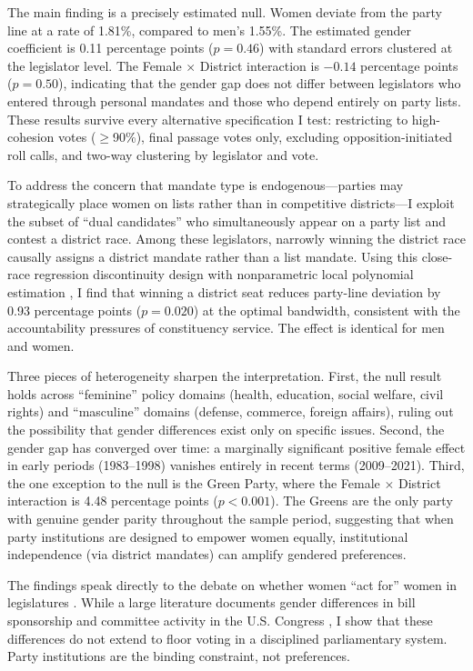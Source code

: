 \documentclass[12pt]{article}
\begin{document}
The main finding is a precisely estimated null. Women deviate from the party line at a rate of 1.81\%, compared to men's 1.55\%. The estimated gender coefficient is 0.11 percentage points ($p = 0.46$) with standard errors clustered at the legislator level. The Female $\times$ District interaction is $-0.14$ percentage points ($p = 0.50$), indicating that the gender gap does not differ between legislators who entered through personal mandates and those who depend entirely on party lists. These results survive every alternative specification I test: restricting to high-cohesion votes ($\geq$90\%), final passage votes only, excluding opposition-initiated roll calls, and two-way clustering by legislator and vote.

To address the concern that mandate type is endogenous---parties may strategically place women on lists rather than in competitive districts---I exploit the subset of ``dual candidates'' who simultaneously appear on a party list and contest a district race. Among these legislators, narrowly winning the district race causally assigns a district mandate rather than a list mandate. Using this close-race regression discontinuity design with nonparametric local polynomial estimation \citep{calonico2014}, I find that winning a district seat reduces party-line deviation by 0.93 percentage points ($p = 0.020$) at the optimal bandwidth, consistent with the accountability pressures of constituency service. The effect is identical for men and women.

Three pieces of heterogeneity sharpen the interpretation. First, the null result holds across ``feminine'' policy domains (health, education, social welfare, civil rights) and ``masculine'' domains (defense, commerce, foreign affairs), ruling out the possibility that gender differences exist only on specific issues. Second, the gender gap has converged over time: a marginally significant positive female effect in early periods (1983--1998) vanishes entirely in recent terms (2009--2021). Third, the one exception to the null is the Green Party, where the Female $\times$ District interaction is 4.48 percentage points ($p < 0.001$). The Greens are the only party with genuine gender parity throughout the sample period, suggesting that when party institutions are designed to empower women equally, institutional independence (via district mandates) can amplify gendered preferences.

The findings speak directly to the debate on whether women ``act for'' women in legislatures \citep{swers2002, tremblay1998, frederick2009}. While a large literature documents gender differences in bill sponsorship and committee activity in the U.S. Congress \citep{anzia2011, volden2013}, I show that these differences do not extend to floor voting in a disciplined parliamentary system. Party institutions are the binding constraint, not preferences.
\end{document}
